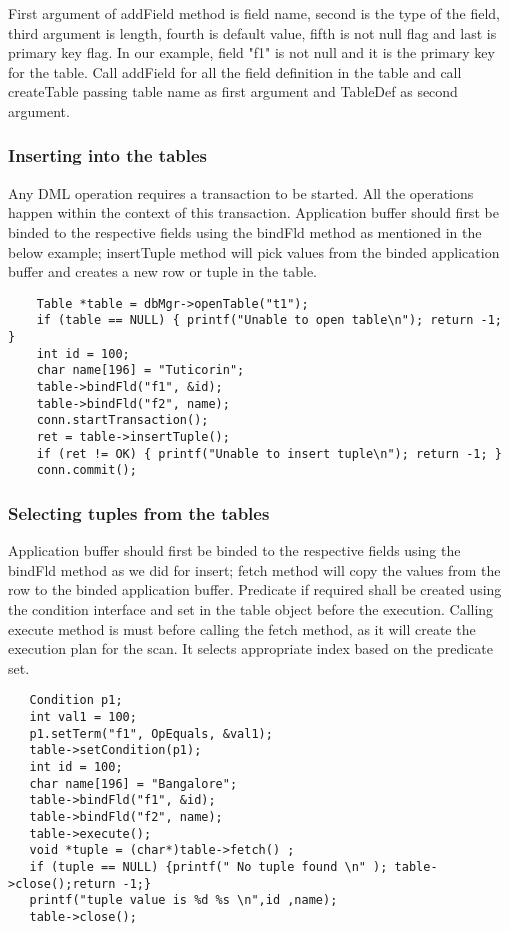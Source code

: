 \documentclass[12pt]{article}
\begin{document}
First argument of addField method is field name, second is the type of the field, third argument is length, fourth is default value, fifth is not null flag and last is primary key flag.
In our example, field "f1" is not null and it is the primary key for the table.
Call addField for all the field definition in the table and call createTable passing table name as first argument and TableDef as second argument.

\subsubsection{Inserting into the tables}
\label{inserttable}
Any DML operation requires a transaction to be started. All the operations happen within the context of this transaction.
Application buffer should first be binded to the respective fields using the bindFld method as mentioned in the below example; insertTuple method will pick values from the binded application buffer and creates a new row or tuple in the table.
\begin{verbatim}
    Table *table = dbMgr->openTable("t1");
    if (table == NULL) { printf("Unable to open table\n"); return -1; }
    int id = 100;
    char name[196] = "Tuticorin";
    table->bindFld("f1", &id);
    table->bindFld("f2", name);
    conn.startTransaction();
    ret = table->insertTuple();
    if (ret != OK) { printf("Unable to insert tuple\n"); return -1; }
    conn.commit();
\end{verbatim}

\subsubsection{Selecting tuples from the tables}
\label{seltable}
Application buffer should first be binded to the respective fields using the bindFld method as we did for insert; fetch method will copy the values from the row to the binded application buffer.
Predicate if required shall be created using the condition interface and set in the table object before the execution. Calling execute method is must before calling the fetch method, as it will create the execution plan for the scan. It selects appropriate index based on the predicate set.

\begin{verbatim}
   Condition p1;
   int val1 = 100;
   p1.setTerm("f1", OpEquals, &val1);
   table->setCondition(p1);
   int id = 100;
   char name[196] = "Bangalore";
   table->bindFld("f1", &id);
   table->bindFld("f2", name);
   table->execute();
   void *tuple = (char*)table->fetch() ;
   if (tuple == NULL) {printf(" No tuple found \n" ); table->close();return -1;}
   printf("tuple value is %d %s \n",id ,name);
   table->close();
\end{verbatim}
  
\end{document}
